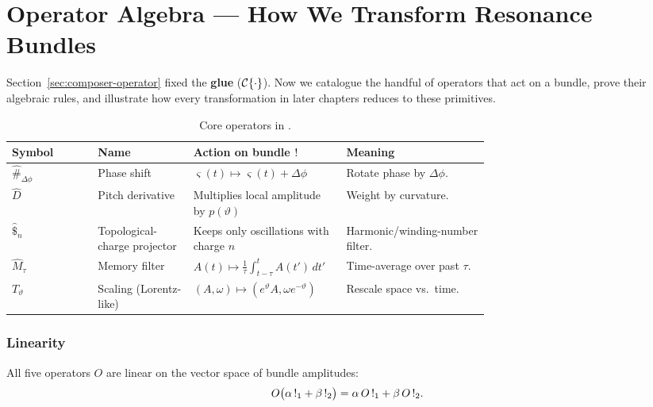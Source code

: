 \section{Operator Algebra — How We Transform Resonance Bundles}
\label{sec:operator-algebra}

Section~\ref{sec:composer-operator} fixed the \textbf{glue} (\(\mathcal{C}\{\cdot\}\)). Now we catalogue the handful of operators that act on a bundle, prove their algebraic rules, and illustrate how every transformation in later chapters reduces to these primitives.

\begin{table}[H]
  \small
  \centering
  \caption{Core operators in \RCM.}
  \label{tab:rcm-operator-algebra}
  \renewcommand{\arraystretch}{1.15}
  \begin{tabularx}{\linewidth}{@{}p{0.18\linewidth} p{0.20\linewidth} p{0.32\linewidth} X@{}}
    \toprule
    \textbf{Symbol}              & \textbf{Name}               & \textbf{Action on bundle \(\mathsf{!}_{}\)}                     & \textbf{Meaning} \\
    \midrule
    \(\hat{\#}_{\Delta\phi}\)    & Phase shift                 & \(\varsigma(t)\mapsto\varsigma(t)+\Delta\phi\)          & Rotate phase by \(\Delta\phi\). \\
    \(\hat{D}\)                  & Pitch derivative            & Multiplies local amplitude by \(p(\vartheta)\)          & Weight by curvature. \\
    \(\hat{\$}_{n}\)             & Topological-charge projector& Keeps only oscillations with charge \(n\)               & Harmonic/winding-number filter. \\
    \(\hat{M}_{\tau}\)           & Memory filter               & \(A(t)\mapsto\frac1\tau\int_{t-\tau}^{t}A(t')\,dt'\)    & Time-average over past \(\tau\). \\
    \(T_{\vartheta}\)            & Scaling (Lorentz-like)      & \((A,\omega)\mapsto(e^{\vartheta}A,\omega e^{-\vartheta})\) & Rescale space vs.\ time. \\
    \bottomrule
  \end{tabularx}
\end{table}

\subsubsection{Linearity}

All five operators \(O\) are linear on the vector space of bundle amplitudes:
\[
  O\bigl(\alpha\,\mathsf{!}_{1} + \beta\,\mathsf{!}_{2}\bigr)
  = \alpha\,O\,\mathsf{!}_{1} + \beta\,O\,\mathsf{!}_{2}.
\]
